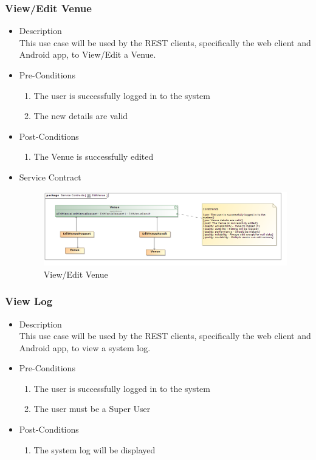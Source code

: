 \documentclass[a4paper,10pt]{article}
\begin{document}
\subsubsection{View/Edit Venue}
	\begin{itemize}
		\item Description\\
			This use case will be used by the REST clients, specifically the web client and Android app, to View/Edit a Venue.
		\item Pre-Conditions
			\begin{enumerate}
				\item The user is successfully logged in to the system
				\item The new details are valid
			\end{enumerate}
		\item Post-Conditions
			\begin{enumerate}
				\item The Venue is successfully edited
						
			\end{enumerate}
		\item Service Contract
			\begin{figure}[H]
				\includegraphics[scale=0.5]{EditVenue}
				\caption{View/Edit Venue}
			\end{figure}
	\end{itemize}


\subsubsection{View Log}
	\begin{itemize}
		\item Description\\
			This use case will be used by the REST clients, specifically the web client and Android app, to view a system log.
		\item Pre-Conditions
			\begin{enumerate}
				\item The user is successfully logged in to the system
				\item The user must be a Super User
			\end{enumerate}
		\item Post-Conditions
			\begin{enumerate}
				\item The system log will be displayed
				
						
			\end{enumerate}
	\end{itemize}
\end{document}
